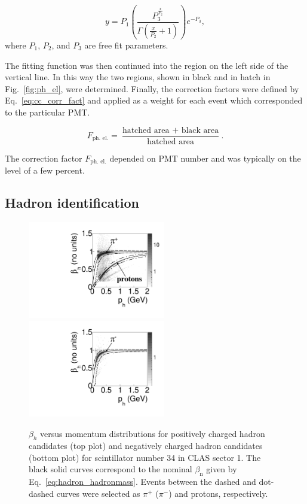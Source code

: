 \documentclass[prc,twocolumn,superscriptaddress,showpacs,amssymb,amsmath,amsfonts,aps,nofootinbib]{revtex4-1}
\begin{document}
\begin{equation}
y = P_{1}\left(\frac{P_{3}^{\frac{x}{P_{2}}}}{\Gamma\left(\frac{x}{P_{2}}+1\right)}
\right)e^{-P_{3}},
\label{eq:cc_Poisson}
\end{equation}
where $P_{1}$, $P_{2}$, and $P_{3}$ are free fit parameters.

The fitting function was then continued into the region on the left side of the vertical line. In this way the two regions, shown in black and in hatch in Fig.~\ref{fig:ph_el}, were determined. Finally, the correction factors were defined by Eq.~\eqref{eq:cc_corr_fact} and applied as a weight for each event which corresponded to the particular PMT. 

\begin{equation}
F_{\text{ph. el.}} = \frac{\text{hatched area} {\,\,+\,\,} \text{black  area}}{\text{hatched area}} \textrm{.}
\label{eq:cc_corr_fact}
\end{equation}

The correction factor $F_{\text{ph. el.}}$ depended on PMT number and was typically on the level of a few percent.



\subsection{Hadron identification}

\begin{figure}[htp]
\begin{center}
 \includegraphics[width=6cm,keepaspectratio]{pictures/hadron_id/b_vs_p_positiv_time_corr.pdf}
\includegraphics[width=6cm,keepaspectratio]{pictures/hadron_id/b_vs_p_negative_time_corr.pdf} 
\vspace{-0.1cm}
\caption{$\beta_{h}$ versus momentum distributions for positively charged hadron candidates (top plot) and  negatively charged hadron candidates (bottom plot) for scintillator number 34 in CLAS sector 1. The black solid curves correspond to the nominal $\beta_{\text{n}}$ given by Eq.~\eqref{eq:hadron_hadronmass}. 
Events between the dashed and dot-dashed curves were selected as $\pi^{+}$ ($\pi^{-}$) and protons, respectively.}
\label{fig:b_vs_p}
\end{center}
\end{figure} 
\end{document}
